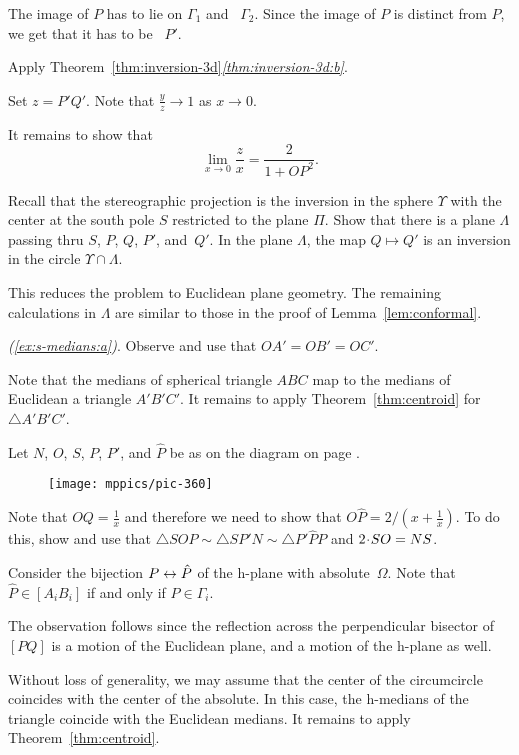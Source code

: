 The image of $P$ has to lie on $\Gamma_1$ and ~$\Gamma_2$.
Since the image of $P$ is distinct from $P$, we get that it has to be ~$P'$.

Apply Theorem~\ref{thm:inversion-3d}\textit{\ref{thm:inversion-3d:b}}.

Set $z=P'Q'$.
Note that $\tfrac yz\to 1$ as $x\to 0$.

It remains to show that 
$$\lim_{x\to 0} \frac{z}{x}=\frac{2}{1+OP^2}.$$

Recall that the stereographic projection is the inversion in the sphere $\Upsilon$ with the center at the south pole $S$ restricted to the plane $\Pi$.
Show that there is a plane $\Lambda$ passing thru $S$, $P$, $Q$, $P'$, and~$Q'$.
In the plane $\Lambda$, the map $Q\mapsto Q'$ is an inversion in the circle $\Upsilon\cap \Lambda$.

This reduces the problem to Euclidean plane geometry.
The remaining calculations in $\Lambda$ are similar to those in the proof of Lemma~\ref{lem:conformal}.

\textit{(\ref{ex:s-medians:a})}.
Observe and use that 
$OA'=OB'=OC'$.

 Note that the medians of spherical triangle $ABC$ 
map to the medians of Euclidean a triangle $A'B'C'$.
It remains to apply Theorem~\ref{thm:centroid} for $\triangle A'B'C'$.

\setcounter{eqtn}{0}

Let $N$, $O$, $S$, $P$, $P'$, and $\hat P$ 
be as on the diagram on page 
\pageref{pic:stereographic_projection-klein}.

{

\begin{wrapfigure}[10]{r}{42mm}
\centering
\vskip-0mm
\texttt{[image: mppics/pic-360]}
\end{wrapfigure}

Note that $OQ=\tfrac1x$ and therefore we need to show that $O\hat P=2/(x+\tfrac1x)$.
To do this, show and use that 
$\triangle SOP\sim \triangle SP'N\sim \triangle P'\hat PP$
and
$2\cdot SO\z=NS$.


Consider the bijection $P\z\leftrightarrow \hat P$ of the h-plane with absolute~$\Omega$.
Note that $\hat P\in [A_iB_i]$ if and only if $P\in\Gamma_i$.

The observation follows since the reflection across the perpendicular bisector of $[PQ]$ is a motion of the Euclidean plane, and a motion of the h-plane as well.

Without loss of generality, we may assume that 
the center of the circumcircle coincides with the center of the absolute.
In this case, the h-medians of the triangle coincide with the Euclidean medians.
It remains to apply Theorem~\ref{thm:centroid}.

}

